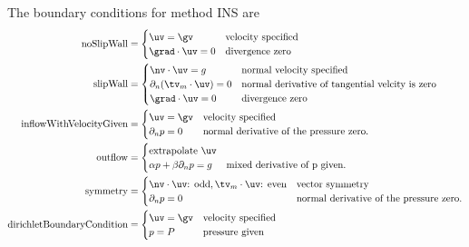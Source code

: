 \documentclass[12pt]{article}
\begin{document}
The boundary conditions for method INS are
\begin{align*}
  \text{noSlipWall} &= \begin{cases}
                           \uv = \gv & \text{velocity specified} \\
                           \grad\cdot\uv=0 & \text{divergence zero} 
                       \end{cases}  \\
  \text{slipWall}   &=
     \begin{cases}
       \nv\cdot\uv = g & \text{normal velocity specified} \\
       \partial_n(\tv_m\cdot\uv) =0 & \text{normal derivative of tangential velcity is zero} \\
     \grad\cdot\uv=0 & \text{divergence zero} 
     \end{cases}  \\
  \text{inflowWithVelocityGiven} &= \begin{cases}
                           \uv = \gv & \text{velocity specified} \\
                           \partial_n p =0 & \text{normal derivative of the pressure zero.}
                       \end{cases}  \\
  \text{outflow} &= \begin{cases}
                        \text{extrapolate~} \uv & \text{} \\
                        \alpha p + \beta \partial_n p = g & \text{mixed derivative of p given.}
                       \end{cases} \\
  \text{symmetry} &= \begin{cases}
                           \nv\cdot\uv \text{: odd}, \tv_m\cdot\uv \text{: even}  & \text{vector symmetry} \\
                           \partial_n p =0 & \text{normal derivative of the pressure zero.}
                       \end{cases}  \\
  \text{dirichletBoundaryCondition} &= \begin{cases}
                           \uv = \gv & \text{velocity specified} \\
                           p = P     & \text{pressure given} 
                       \end{cases}  
\end{align*}
\end{document}
